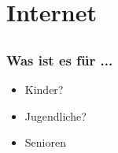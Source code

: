 \documentclass[12pt]{beamer}
\begin{document}
\section{Internet}
\subsection{}

\begin{frame}
	\frametitle{Was ist es für ...}
	\begin{itemize}
		\item<1-> Kinder?
		\begin{center}
		\end{center}
		\item<3-> Jugendliche?
		\begin{center}
		\end{center}
		\item<5-> Senioren
		\begin{center}
\end{center}
\end{itemize}
\end{frame}
\end{document}
